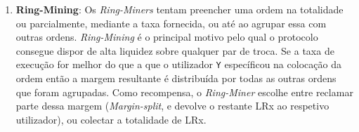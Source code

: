 \documentclass[UTF8,nofonts]{article}
\makeatletter
\newenvironment{figurehere}
 {\def\@captype{figure}}
 {}
\makeatother
\begin{document}
\begin{multicols}{2}
\begin{enumerate}
\begin{center}
\begin{figurehere}

\caption{Loopring Exchange Process}
\label{fig:process}
\end{figurehere}
\end{center}





\item \textbf{Ring-Mining}: Os \textit{Ring-Miners} tentam preencher uma ordem na totalidade ou parcialmente, mediante a taxa fornecida, ou até ao agrupar essa com outras ordens. \textit{Ring-Mining} é o principal motivo pelo qual o protocolo consegue dispor de alta liquidez sobre qualquer par de troca. Se a taxa de execução for melhor do que a que o utilizador \verb|Y| específicou na colocação da ordem então a margem resultante é distribuída por todas as outras ordens que foram agrupadas. Como recompensa, o \textit{Ring-Miner} escolhe entre reclamar parte dessa margem (\textit{Margin-split}, e devolve o restante LRx ao respetivo utilizador), ou colectar a totalidade de LRx.





\end{enumerate}
\end{multicols}
\end{document}
